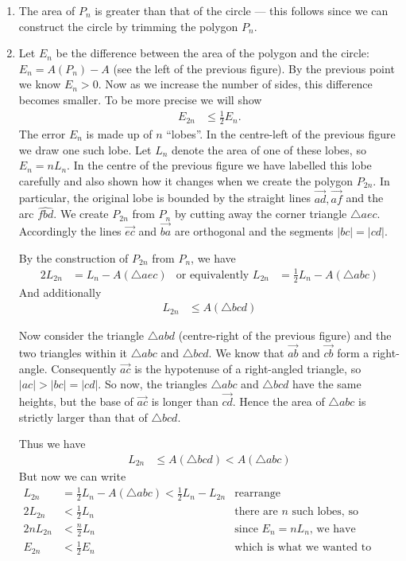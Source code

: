 \begin{enumerate}
 \item The area of $P_n$ is greater than that of the circle --- this follows since we
can construct the circle by trimming the polygon $P_n$.

 \item Let $E_n$ be the difference between the area of the polygon and the circle: $E_n =
A(P_n)-A$ (see the left of the previous figure). By the previous point we know $E_n>0$.
Now as we increase the number of sides, this difference becomes smaller. To be more
precise we will show
  \begin{align*}
  E_{2n} & \leq \frac{1}{2} E_n.
  \end{align*}
The error $E_n$ is made up of $n$ ``lobes''. In the centre-left of the previous figure we
draw one such lobe. Let $L_n$ denote the area of one of these lobes, so $E_n = nL_n$.  In
the centre of the previous figure we have labelled this lobe carefully and also shown how
it changes when we create the polygon $P_{2n}$. In particular, the original lobe is
bounded by the straight lines $\vec{ad}, \vec{af}$ and the arc $\widehat{fbd}$. We create
$P_{2n}$ from $P_n$ by cutting away the corner triangle $\triangle aec$. Accordingly the
lines $\vec{ec}$ and $\vec{ba}$ are orthogonal and the segments $|bc|=|cd|$.

By the construction of $P_{2n}$ from $P_n$, we have
\begin{align*}
  2L_{2n} &= L_n - A( \triangle aec) & \text{or equivalently }
  L_{2n} &= \frac{1}{2} L_n - A( \triangle abc)
\end{align*}
And additionally
\begin{align*}
  L_{2n} & \leq A( \triangle bcd)
\end{align*}

Now consider the triangle $\triangle abd$ (centre-right of the previous figure) and the
two triangles within it $\triangle abc$ and $\triangle bcd$. We know that $\vec{ab}$ and
$\vec{cb}$ form a right-angle. Consequently $\vec{ac}$ is the hypotenuse of a right-angled
triangle, so $|ac|>|bc| = |cd|$. So now, the triangles $\triangle abc$ and $\triangle bcd$
have the same heights, but the base of $\vec{ac}$ is longer than $\vec{cd}$. Hence the
area of $\triangle abc$ is strictly larger than that of $\triangle bcd$.

Thus we have
\begin{align*}
  L_{2n} & \leq A(\triangle bcd) < A(\triangle abc)
\end{align*}
But now we can write
\begin{align*}
  L_{2n} &= \frac{1}{2} L_n - A( \triangle abc) < \frac{1}{2} L_n - L_{2n}  &
\text{rearrange}\\
  2L_{2n} &< \frac{1}{2} L_n & \text{there are $n$ such lobes, so } \\
  2n L_{2n} &< \frac{n}{2} L_n & \text{since $E_n = n L_n$, we have}\\
  E_{2n} & < \frac{1}{2} E_n & \text{which is what we wanted to show.}
\end{align*}



\end{enumerate}
